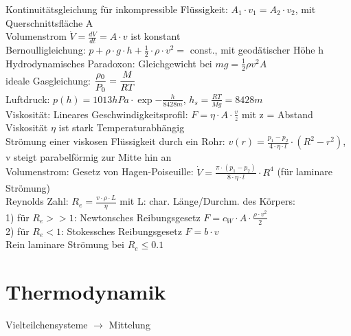 \documentclass[fs, footer]{latex4ei}
\begin{document}
\begin{multicols*}{4}
Kontinuitätsgleichung für inkompressible Flüssigkeit: $A_1\cdot v_1 = A_2\cdot v_2$, mit Querschnittsfläche A\\
Volumenstrom $\dot V = \frac{dV}{dt} = A\cdot v$ ist konstant\\
Bernoulligleichung: $p + \rho\cdot g\cdot h + \frac{1}{2}\cdot \rho\cdot v^2 =$ const., mit geodätischer Höhe h\\
Hydrodynamisches Paradoxon: Gleichgewicht bei $mg = \iffalse $p_{\text{atm}}\cdot A - p_1\cdot A =$ \fi
\frac{1}{2} \rho  v^2  A$\\ 
ideale Gasgleichung: $ \dfrac{\rho _0}{P_0} = \dfrac{M}{RT}$\\
Luftdruck: $p(h) = 1013hPa\cdot\exp{-\frac{h}{8428m}}$, $h_s = \frac{RT}{Mg} = 8428m$\\

Viskosität: Lineares Geschwindigkeitsprofil: $F = \eta\cdot A\cdot\frac{v}{z}$ mit z = Abstand\\
Viskosität $\eta$ ist stark Temperaturabhängig\\

Strömung einer viskosen Flüssigkeit durch ein Rohr: $v(r) = \frac{p_1-p_2}{4\cdot\eta\cdot l}\cdot(R^2-r^2)$, v steigt parabelförmig zur Mitte hin an\\
Volumenstrom: %
Gesetz von Hagen-Poiseuille: $\dot V  = \frac{\pi\cdot(p_1-p_2)}{8\cdot\eta\cdot l}\cdot R^4$ (für laminare Strömung)\\

Reynolds Zahl: $R_e = \frac{v \cdot\rho \cdot L}{\eta}$ mit L: char. Länge/Durchm. des Körpers:\\ 
1) für $R_e >> 1$: Newtonsches Reibungsgesetz $F = c_W \cdot A \cdot \frac{\rho\cdot v^2}{2}$\\
2) für $R_e < 1$: Stokessches Reibungsgesetz $F = b\cdot v$\\
Rein laminare Strömung bei $R_e \leq 0.1$\\





\section{Thermodynamik}
Vielteilchensysteme $\rightarrow$ Mittelung\\


\end{multicols*}
\end{document}
